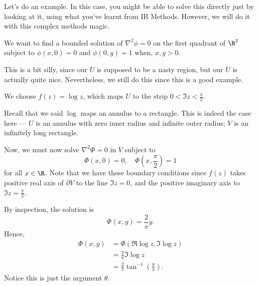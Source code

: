 \documentclass[a4paper]{article}
\begin{document}
Let's do an example. In this case, you might be able to solve this directly just by looking at it, using what you've learnt from IB Methods. However, we will do it with this complex methods magic.
\begin{eg}
  We want to find a bounded solution of $\nabla^2 \phi = 0$ on the first quadrant of $\R^2$ subject to $\phi(x, 0) = 0$ and $\phi(0, y) = 1$ when, $x, y > 0$.

  This is a bit silly, since our $U$ is supposed to be a nasty region, but our $U$ is actually quite nice. Nevertheless, we still do this since this is a good example.

  We choose $f(z) = \log z$, which maps $U$ to the strip $0 < \Im z < \frac{\pi}{2}$.
  \begin{center}
  \end{center}
  Recall that we said $\log$ maps an annulus to a rectangle. This is indeed the case here --- $U$ is an annulus with zero inner radius and infinite outer radius; $V$ is an infinitely long rectangle.

  Now, we must now solve $\nabla^2 \Phi = 0$ in $V$ subject to
  \[
    \Phi(x, 0) = 0,\quad \Phi\left(x, \frac{\pi}{2}\right) = 1
  \]
  for all $x \in \R$. Note that we have these boundary conditions since $f(z)$ takes positive real axis of $\partial V$ to the line $\Im z = 0$, and the positive imaginary axis to $\Im z = \frac{\pi}{2}$.

  By inspection, the solution is
  \[
    \Phi(x, y) = \frac{2}{\pi}y.
  \]
  Hence,
  \begin{align*}
    \Phi(x, y) &= \Phi(\Re \log z, \Im \log z)\\
    &= \frac{2}{\pi} \Im \log z\\
    &= \frac{2}{\pi} \tan^{-1}\left(\frac{y}{x}\right).
  \end{align*}
  Notice this is just the argument $\theta$.
\end{eg}
\end{document}
